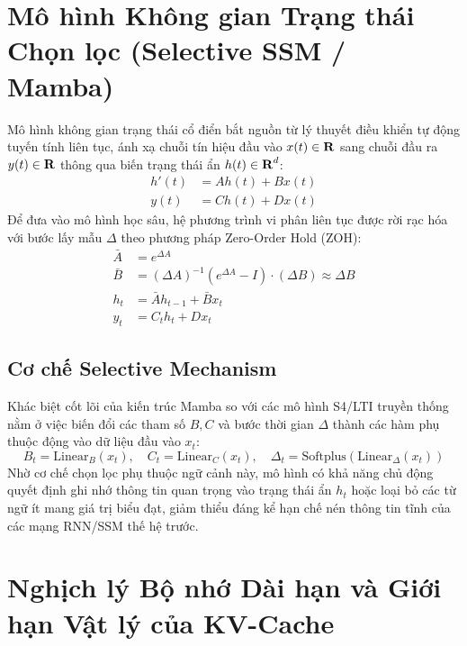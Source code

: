 \documentclass{uetgraduation}
\renewcommand{\mathbb}[1]{\text{\textbf{#1}}}
\begin{document}
\section{Mô hình Không gian Trạng thái Chọn lọc (Selective SSM / Mamba)}
Mô hình không gian trạng thái cổ điển bắt nguồn từ lý thuyết điều khiển tự động tuyến tính liên tục, ánh xạ chuỗi tín hiệu đầu vào $x(t) \in \mathbb{R}$ sang chuỗi đầu ra $y(t) \in \mathbb{R}$ thông qua biến trạng thái ẩn $h(t) \in \mathbb{R}^d$:
\begin{align}
h'(t) &= A h(t) + B x(t) \\
y(t) &= C h(t) + D x(t)
\end{align}
Để đưa vào mô hình học sâu, hệ phương trình vi phân liên tục được rời rạc hóa với bước lấy mẫu $\Delta$ theo phương pháp Zero-Order Hold (ZOH):
\begin{align}
\bar{A} &= e^{\Delta A} \\
\bar{B} &= (\Delta A)^{-1}(e^{\Delta A} - I) \cdot (\Delta B) \approx \Delta B \\
h_t &= \bar{A} h_{t-1} + \bar{B} x_t \\
y_t &= C_t h_t + D x_t
\end{align}

\subsection{Cơ chế Selective Mechanism}
Khác biệt cốt lõi của kiến trúc Mamba so với các mô hình S4/LTI truyền thống nằm ở việc biến đổi các tham số $B, C$ và bước thời gian $\Delta$ thành các hàm phụ thuộc động vào dữ liệu đầu vào $x_t$:
\begin{equation}
B_t = \text{Linear}_B(x_t), \quad C_t = \text{Linear}_C(x_t), \quad \Delta_t = \text{Softplus}(\text{Linear}_\Delta(x_t))
\end{equation}
Nhờ cơ chế chọn lọc phụ thuộc ngữ cảnh này, mô hình có khả năng chủ động quyết định ghi nhớ thông tin quan trọng vào trạng thái ẩn $h_t$ hoặc loại bỏ các từ ngữ ít mang giá trị biểu đạt, giảm thiểu đáng kể hạn chế nén thông tin tĩnh của các mạng RNN/SSM thế hệ trước.

\section{Nghịch lý Bộ nhớ Dài hạn và Giới hạn Vật lý của KV-Cache}
\end{document}
